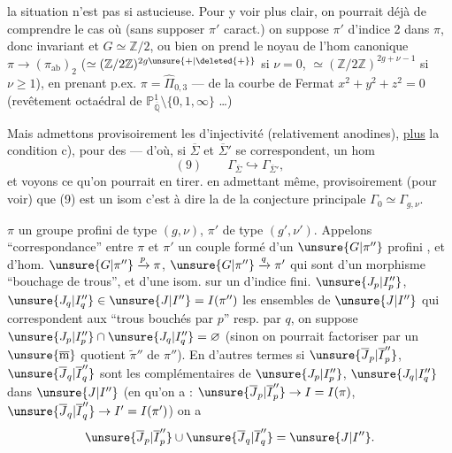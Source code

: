la situation n'est  pas si astucieuse.
Pour y voir plus clair, on pourrait déjà
 de comprendre le cas où (sans
supposer $\pi'$ caract.) on suppose $\pi'$ d'indice
2 dans $\pi$, donc invariant et $G\simeq\mathbb Z/2$, ou
bien on prend  le noyau de l'hom
canonique $\pi\longrightarrow(\pi_{\mathrm{ab}})_2$ ($\simeq(\mathbb Z/2\mathbb Z)^{2g\unsure{+|\deleted{+}}}$ si $\nu=0$,
$\simeq(\mathbb Z/2\mathbb Z)^{2g+\nu-1}$ si $\nu\geq1$), en prenant p.ex.
$\pi=\widehat\Pi_{0,3}$ ---  de la courbe de
Fermat $x^2+y^2+z^2=0$ (revêtement octaédral
de $\mathbb P^1_{\overline{\mathbb Q}}\setminus\{0,1,\infty\}$ \dots)

Mais admettons provisoirement les 
d'injectivité (relativement anodines), \uline{plus} la
condition c), pour  des  ---
d'où, si $\overline\Sigma$ et $\overline\Sigma'$ se correspondent, un hom
\[
(9)\qquad \Gamma_{\overline\Sigma}\hookrightarrow\Gamma_{\overline\Sigma'},
\]
et voyons ce qu'on pourrait en tirer.
en admettant même, provisoirement (pour
voir) que (9) est un isom 
c'est à dire  la  de la conjecture
principale $\Gamma_0\simeq\Gamma_{g,\nu}$.


 $\pi$ un groupe profini  de type $(g,\nu)$, $\pi'$ de type $(g',\nu')$. Appelons ``correspondance'' entre $\pi$ et $\pi'$ un  couple formé d'un $\unsure{G|\pi''}$ profini  , et d'hom.  $\unsure{G|\pi''}\xrightarrow{p}\pi$, $\unsure{G|\pi''}\xrightarrow{q}\pi'$ qui sont    d'un morphisme ``bouchage de trous'', et d'une  isom. sur un  d'indice fini.
 $\unsure{J_p|I''_p}$, $\unsure{J_q|I''_q}\in\unsure{J|I''}=I(\pi'')$ les ensembles de $\unsure{J|I''}$ qui correspondent aux ``trous bouchés par $p$'' resp. par $q$, on suppose  $\unsure{J_p|I''_p}\cap\unsure{J_q|I''_q}=\varnothing$ (sinon on pourrait factoriser par un $\unsure{\overline{\mathrm m}}$ quotient $\widetilde{\pi}''$ de $\pi''$). En d'autres termes si $\unsure{\overline{J}_p|\overline{I}''_p}$, $\unsure{\overline{J}_q|\overline{I}''_q}$ sont les complémentaires de $\unsure{J_p|I''_p}$, $\unsure{J_q|I''_q}$ dans $\unsure{J|I''}$ (en  qu'on a : $\unsure{\overline{J}_p|\overline{I}''_p}\to I=I(\pi)$, $\unsure{\overline{J}_q|\overline{I}''_q}\to I'=I(\pi')$) on a
\[
\unsure{\overline{J}_p|\overline{I}''_p}\cup\unsure{\overline{J}_q|\overline{I}''_q}=\unsure{J|I''}.
\]

